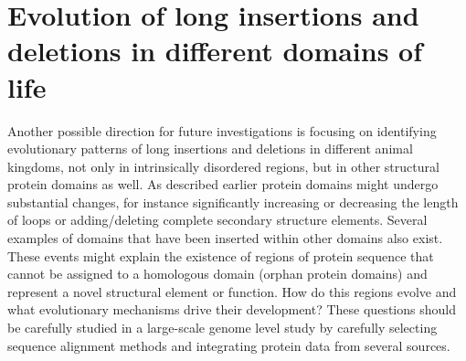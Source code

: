 \documentclass[11pt, a4paper,oneside]{report}
\begin{document}
 \section{Evolution of long insertions and deletions in different domains of life}
 Another possible direction for future investigations is focusing on identifying evolutionary patterns of long insertions and deletions in different animal kingdoms, not only in intrinsically disordered regions, but in other structural protein domains as well.  As described earlier protein domains might undergo substantial changes, for instance significantly increasing or decreasing the length of loops or adding/deleting complete secondary structure elements. Several examples of domains that have been inserted within other domains also exist. These events might explain the existence of regions of protein sequence that cannot be assigned to a homologous domain (orphan protein domains) and represent a novel structural element or function. How do this regions evolve and what evolutionary mechanisms drive their development? These questions should be carefully studied in a large-scale genome level study by carefully selecting sequence alignment methods and integrating protein data from several sources. 



\end{document}
